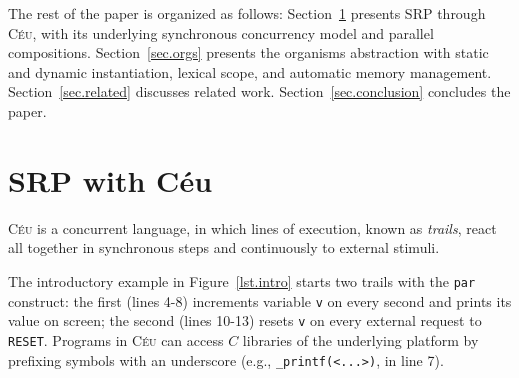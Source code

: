 \documentclass{acm_proc_article-sp}
\newcommand{\CEU}{\textsc{C\'{e}u}\xspace}
\newcommand{\code}[1] {{\small{\texttt{#1}}}}
\newcommand{\1}{\;}
\newcommand{\2}{\;\;}
\newcommand{\3}{\;\;\;}
\newcommand{\5}{\;\;\;\;\;}
\begin{document}
The rest of the paper is organized as follows:
Section~\ref{sec.ceu} presents SRP through \CEU, with its underlying 
synchronous concurrency model and parallel compositions.
Section~\ref{sec.orgs} presents the organisms abstraction with static and 
dynamic instantiation, lexical scope, and automatic memory management.
Section~\ref{sec.related} discusses related work.
Section~\ref{sec.conclusion} concludes the paper.

\section{SRP with C\'eu}
\label{sec.ceu}

\CEU is a concurrent language, in which lines of execution, known as 
\emph{trails}, react all together in synchronous steps and continuously to 
external stimuli.
%

The introductory example in Figure~\ref{lst.intro} starts two trails with the 
\code{par} construct: the first (lines 4-8) increments variable \code{v} on 
every second and prints its value on screen; the second (lines 10-13) resets 
\code{v} on every external request to \code{RESET}.
%
%
Programs in \CEU can access $C$ libraries of the underlying platform by 
prefixing symbols with an underscore (e.g., \code{\_printf(<...>)}, in line 7).
\end{document}
